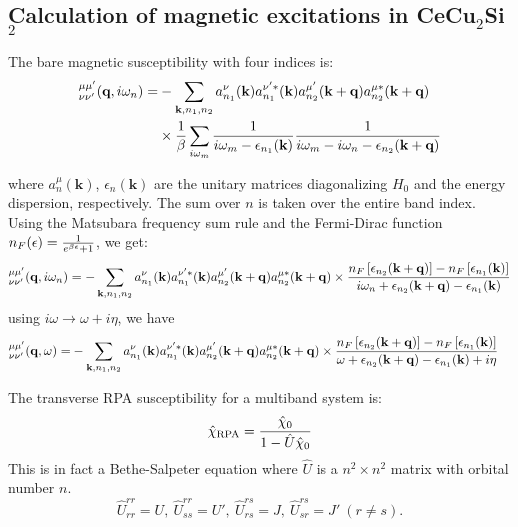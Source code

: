 \documentclass[aps,prl,onecolumn,amsmath,amssymb,superscriptaddress]{revtex4}
\begin{document}
\subsection{Calculation of magnetic excitations in CeCu$_2$Si$_2$}
The bare magnetic susceptibility with four indices is:
\begin{align}
	[\chi_{0}]^{\mu\mu'}_{\nu\nu'}(\textbf{q},i\omega_{n}) = & -  \sum_{\textbf{k},n_{1},n_{2}} a^{\nu}_{n_{1}}(\textbf{k})a^{\nu'*}_{n_{1}}(\textbf{k}) a^{\mu'}_{n_{2}}(\textbf{k}+\textbf{q})a^{\mu*}_{n_{2}}(\textbf{k}+\textbf{q}) \\
	& \times { 1 \over \beta} \sum_{i\omega_{m}} {1 \over i\omega_{m}-\epsilon_{n_{1}}(\textbf{k})} {1 \over i\omega_{m}-i\omega_{n}-\epsilon_{n_{2}}(\textbf{k}+\textbf{q})}
\end{align}

where $a^{\mu}_{n}(\textbf{k})$, $\epsilon_{n}(\textbf{k})$ are the unitary matrices diagonalizing $H_{0}$ and the energy dispersion,  respectively. The sum over $n$ is taken over the entire band index.
Using the Matsubara frequency sum rule and the Fermi-Dirac function $n_{F}(\epsilon)={1 \over e^{\beta \epsilon}+ 1}$,  we get:
\begin{align}
	[\chi_{0}]^{\mu\mu'}_{\nu\nu'}(\textbf{q},i\omega_{n}) 
	= -  \sum_{\textbf{k},n_{1},n_{2}} a^{\nu}_{n_{1}}(\textbf{k})a^{\nu'*}_{n_{1}}(\textbf{k}) a^{\mu'}_{n_{2}}(\textbf{k}+\textbf{q})a^{\mu*}_{n_{2}}(\textbf{k}+\textbf{q}) 
	\times {n_{F}\left[\epsilon_{n_{2}}(\textbf{k}+\textbf{q})\right] - n_{F}\left[\epsilon_{n_{1}}(\textbf{k})\right] \over i\omega_{n} + \epsilon_{n_{2}}(\textbf{k}+\textbf{q})-\epsilon_{n_{1}}(\textbf{k})}
\end{align}
using $i\omega \rightarrow \omega+i\eta$, we have
\begin{align}
	[\chi_{0}]^{\mu\mu'}_{\nu\nu'}(\textbf{q},\omega) = & -  \sum_{\textbf{k},n_{1},n_{2}} a^{\nu}_{n_{1}}(\textbf{k})a^{\nu'*}_{n_{1}}(\textbf{k}) a^{\mu'}_{n_{2}}(\textbf{k}+\textbf{q})a^{\mu*}_{n_{2}}(\textbf{k}+\textbf{q}) 
	\times {n_{F}\left[\epsilon_{n_{2}}(\textbf{k}+\textbf{q})\right] - n_{F}\left[\epsilon_{n_{1}}(\textbf{k})\right]\over \omega + \epsilon_{n_{2}}(\textbf{k}+\textbf{q})-\epsilon_{n_{1}}(\textbf{k}) + i\eta}
\end{align}


The transverse RPA susceptibility for a multiband system is: 
\begin{equation}
	\hat{\chi}_{\rm RPA} = \frac{\hat{\chi}_0}{1 - \hat U \hat{\chi}_0 }
\end{equation}
This is in fact a Bethe-Salpeter equation where $\hat{U}$ is a $n^2\times n^2$ matrix with orbital number $n$.
\begin{equation}
	\hat U^{rr}_{rr} = U ,\ 
	\hat U^{rr}_{ss} = U' ,\ 
	\hat U^{rs}_{rs} = J ,\ 
	\hat U^{rs}_{sr} = J' \ (r\not=s).
\end{equation}
\end{document}
